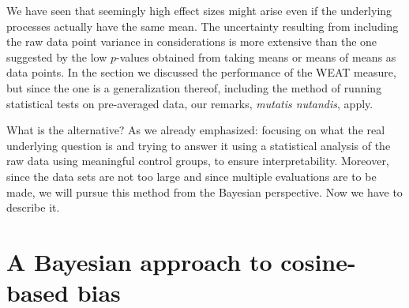 \documentclass{clv3}
\begin{document}
We have seen that seemingly high effect sizes might arise even if the
underlying processes actually have the same mean. The uncertainty
resulting from including the raw data point variance in considerations
is more extensive than the one suggested by the low \(p\)-values
obtained from taking means or means of means as data points. In the
section we discussed the performance of the \textsf{WEAT} measure, but
since the \citep{Manzini2019blackToCriminal} one is a generalization thereof, including the method
of running statistical tests on pre-averaged data, our remarks,
\emph{mutatis nutandis}, apply.

What is the alternative? As we already emphasized: focusing on what the
real underlying question is and trying to answer it using a statistical
analysis of the raw data using meaningful control groups, to ensure
interpretability. Moreover, since the data sets are not too large and
since multiple evaluations are to be made, we will pursue this method
from the Bayesian perspective. Now we have to describe it.






























































\hypertarget{a-bayesian-approach-to-cosine-based-bias}{%
\section{A Bayesian approach to cosine-based
bias}\label{a-bayesian-approach-to-cosine-based-bias}}
\end{document}
